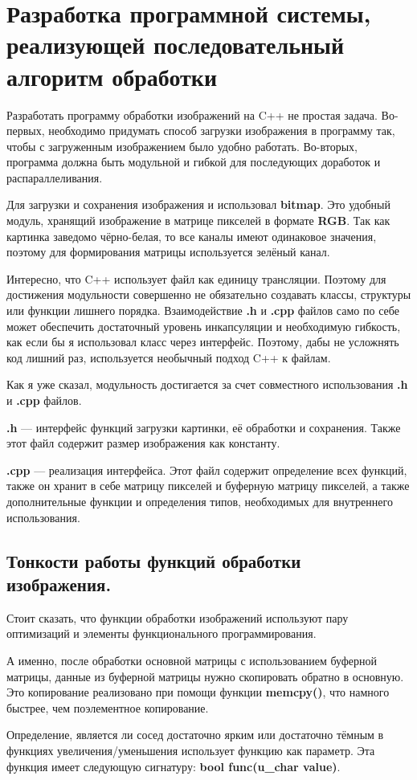 \newpage


\section{Разработка программной системы, реализующей последовательный алгоритм обработки}\label{sec:devprog}
Разработать программу обработки изображений на C++ не простая задача.
Во-первых, необходимо придумать способ загрузки изображения в программу так, чтобы с загруженным изображением было удобно работать.
Во-вторых, программа должна быть модульной и гибкой для последующих доработок и распараллеливания.

Для загрузки и сохранения изображения и использовал \textbf{bitmap}.
Это удобный модуль, хранящий изображение в матрице пикселей в формате \textbf{RGB}.
Так как картинка заведомо чёрно-белая, то все каналы имеют одинаковое значения, поэтому для формирования матрицы используется зелёный канал.

Интересно, что C++ использует файл как единицу трансляции.
Поэтому для достижения модульности совершенно не обязательно создавать классы, структуры или функции лишнего порядка.
Взаимодействие \textbf{.h} и \textbf{.cpp} файлов само по себе может обеспечить достаточный уровень инкапсуляции и необходимую гибкость, как если бы я использовал класс через интерфейс.
Поэтому, дабы не усложнять код лишний раз, используется необычный подход C++ к файлам.

Как я уже сказал, модульность достигается за счет совместного использования \textbf{.h} и \textbf{.cpp} файлов.

\textbf{.h} --- интерфейс функций загрузки картинки, её обработки и сохранения.
Также этот файл содержит размер изображения как константу.

\textbf{.cpp} --- реализация интерфейса.
Этот файл содержит определение всех функций, также он хранит в себе матрицу пикселей и буферную матрицу пикселей, а также дополнительные функции и определения типов, необходимых для внутреннего использования.

\subsection{Тонкости работы функций обработки изображения.}\label{subsec:imageprocessingPickUpOn}
Стоит сказать, что функции обработки изображений используют пару оптимизаций и элементы функционального программирования.

А именно, после обработки основной матрицы с использованием буферной матрицы, данные из буферной матрицы нужно скопировать обратно в основную.
Это копирование реализовано при помощи функции \textbf{memcpy()}, что намного быстрее, чем поэлементное копирование.

Определение, является ли сосед достаточно ярким или достаточно тёмным в функциях увеличения/уменьшения использует функцию как параметр.
Эта функция имеет следующую сигнатуру: \textbf{bool func(u\_char value)}.

